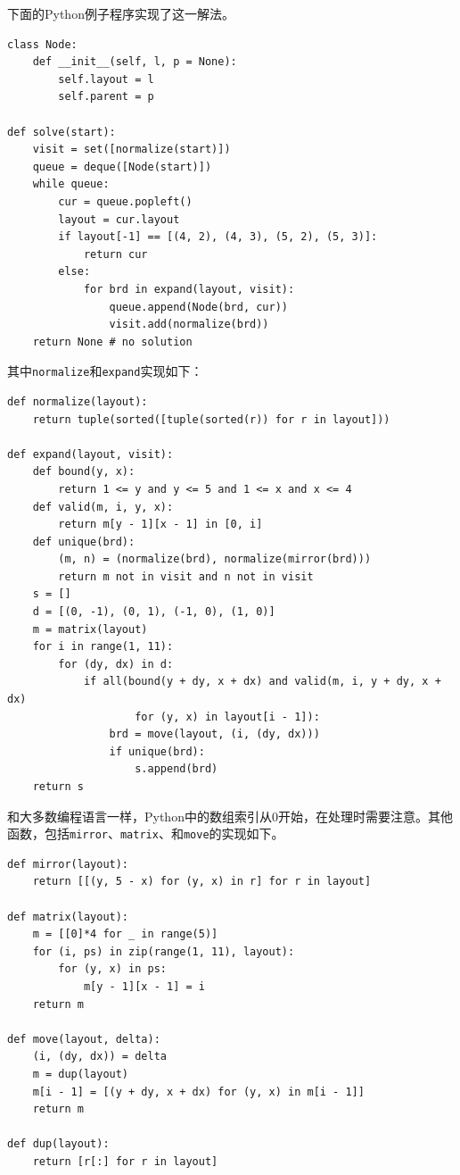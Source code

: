 \documentclass[b5paper]{ctexart}
\begin{document}
下面的Python例子程序实现了这一解法。

\lstset{language=Python}
\begin{lstlisting}
class Node:
    def __init__(self, l, p = None):
        self.layout = l
        self.parent = p

def solve(start):
    visit = set([normalize(start)])
    queue = deque([Node(start)])
    while queue:
        cur = queue.popleft()
        layout = cur.layout
        if layout[-1] == [(4, 2), (4, 3), (5, 2), (5, 3)]:
            return cur
        else:
            for brd in expand(layout, visit):
                queue.append(Node(brd, cur))
                visit.add(normalize(brd))
    return None # no solution
\end{lstlisting}

其中\texttt{normalize}和\texttt{expand}实现如下：

\lstset{language=Python}
\begin{lstlisting}
def normalize(layout):
    return tuple(sorted([tuple(sorted(r)) for r in layout]))

def expand(layout, visit):
    def bound(y, x):
        return 1 <= y and y <= 5 and 1 <= x and x <= 4
    def valid(m, i, y, x):
        return m[y - 1][x - 1] in [0, i]
    def unique(brd):
        (m, n) = (normalize(brd), normalize(mirror(brd)))
        return m not in visit and n not in visit
    s = []
    d = [(0, -1), (0, 1), (-1, 0), (1, 0)]
    m = matrix(layout)
    for i in range(1, 11):
        for (dy, dx) in d:
            if all(bound(y + dy, x + dx) and valid(m, i, y + dy, x + dx)
                    for (y, x) in layout[i - 1]):
                brd = move(layout, (i, (dy, dx)))
                if unique(brd):
                    s.append(brd)
    return s
\end{lstlisting}

和大多数编程语言一样，Python中的数组索引从0开始，在处理时需要注意。其他函数，包括\texttt{mirror}、\texttt{matrix}、和\texttt{move}的实现如下。

\lstset{language=Python}
\begin{lstlisting}
def mirror(layout):
    return [[(y, 5 - x) for (y, x) in r] for r in layout]

def matrix(layout):
    m = [[0]*4 for _ in range(5)]
    for (i, ps) in zip(range(1, 11), layout):
        for (y, x) in ps:
            m[y - 1][x - 1] = i
    return m

def move(layout, delta):
    (i, (dy, dx)) = delta
    m = dup(layout)
    m[i - 1] = [(y + dy, x + dx) for (y, x) in m[i - 1]]
    return m

def dup(layout):
    return [r[:] for r in layout]
\end{lstlisting}
\end{document}
